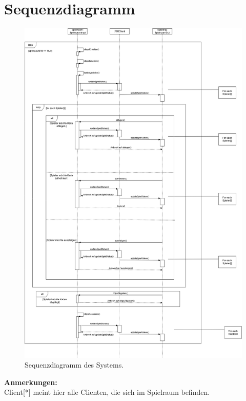\chapter{Sequenzdiagramm}

\begin{figure}[ht]
	\centering
	\includegraphics[width=\textwidth]{sonstige-diagramme/Sequenzdiagramm.png}
	\caption{Sequenzdiagramm des Systems.}
\end{figure}

\textbf{Anmerkungen:}\\ 
Client[*] meint hier alle Clienten, die sich im Spielraum befinden.
